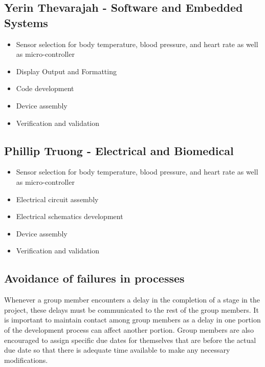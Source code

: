 \documentclass{article}
\begin{document}
        \subsection{Yerin Thevarajah - Software and Embedded Systems}
            \begin{itemize}
                \item Sensor selection for body temperature, blood pressure, and heart rate as well as micro-controller
                \item Display Output and Formatting
                \item Code development
                \item Device assembly
                \item Verification and validation
            \end{itemize}
        \subsection{Phillip Truong - Electrical and Biomedical}
            \begin{itemize}
                \item Sensor selection for body temperature, blood pressure, and heart rate as well as micro-controller
                \item Electrical circuit assembly
                \item Electrical schematics development
                \item Device assembly
                \item Verification and validation
            \end{itemize}
        \subsection{Avoidance of failures in processes}
        Whenever a group member encounters a delay in the completion of a stage in the project, these delays must be communicated to the rest of the group members. It is important to maintain contact among group members as a delay in one portion of the development process can affect another portion. Group members are also encouraged to assign specific due dates for themselves that are before the actual due date so that there is adequate time available to make any necessary modifications. 
        
\end{document}
